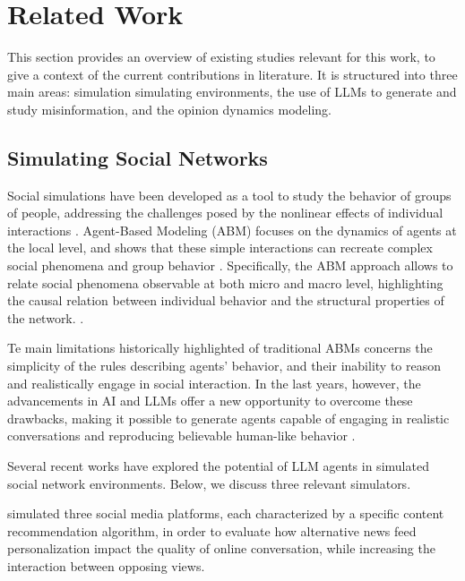 \section{Related Work}
\label{sec:relatedwork}

This section provides an overview of existing studies relevant for this work, to give a context of the current contributions in literature.
It is structured into three main areas: simulation simulating environments, the use of LLMs to generate and study misinformation, and the opinion dynamics modeling.

\subsection{Simulating Social Networks}

Social simulations have been developed as a tool to study the behavior of groups of people, addressing the challenges posed by the nonlinear effects of individual interactions \cite{squazzoni2014socialsimulation}.
Agent-Based Modeling (ABM) focuses on the dynamics of agents at the local level, and shows that these simple interactions can recreate complex social phenomena and group behavior \cite{macy2002abm}.
Specifically, the ABM approach allows to relate social phenomena observable at both micro and macro level, highlighting the causal relation between individual behavior and the structural properties of the network. \cite{squazzoni2014socialsimulation}.

Te main limitations historically highlighted of traditional ABMs concerns the simplicity of the rules \cite{conte2014agent} describing agents' behavior, and their inability to reason and realistically engage in social interaction.\cite{törnberg2023evaluate}
In the last years, however, the advancements in AI and LLMs offer a new opportunity to overcome these drawbacks, making it possible to generate agents capable of engaging in realistic conversations and reproducing believable human-like behavior \cite{park2023genagents}.

Several recent works have explored the potential of LLM agents in simulated social network environments. Below, we discuss three relevant simulators.

\medskip
\citet{törnberg2023evaluate} simulated three social media platforms, each characterized by a specific content recommendation algorithm, in order to evaluate how alternative news feed personalization impact the quality of online conversation, while increasing the interaction between opposing views.

